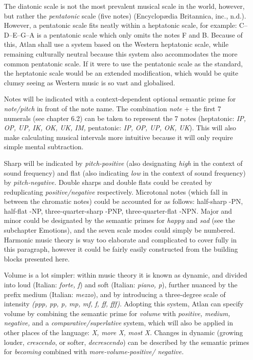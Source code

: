 The diatonic scale is not the most prevalent musical scale in the world, however, but rather the \textit{pentatonic} scale (five notes) (Encyclop\ae dia Britannica, inc., n.d.). However, a pentatonic scale fits neatly within a heptatonic scale, for example: C–D–E–G–A is a pentatonic scale which only omits the notes F and B. Because of this, Atlan shall use a system based on the Western heptatonic scale, while remaining culturally neutral because this system also accommodates the more common pentatonic scale. If it were to use the pentatonic scale as the standard, the heptatonic scale would be an extended modification, which would be quite clumsy seeing as Western music is so vast and globalised. 

Notes will be indicated with a context-dependent optional semantic prime for \textit{note/pitch} in front of the note name. The combination {\it note} + the first 7 numerals (see chapter 6.2) can be taken to represent the 7 notes (heptatonic: \textit{IP, OP, UP, IK, OK, UK, IM,} pentatonic: \textit{IP, OP, UP, OK, UK}). This will also make calculating musical intervals more intuitive because it will only require simple mental subtraction. 

Sharp will be indicated by \textit{pitch-positive} (also designating \textit{high} in the context of sound frequency) and flat (also indicating \textit{low} in the context of sound frequency) by \textit{pitch-negative.} Double sharps and double flats could be created by reduplicating \textit{positive/negative} respectively. Microtonal notes (which fall in between the chromatic notes) could be accounted for as follows: half-sharp -PN, half-flat -NP, three-quarter-sharp  -PNP, three-quarter-flat -NPN. Major and minor could be designated by the semantic primes for \textit{happy} and \textit{sad} (see the subchapter Emotions), and the seven scale modes could simply be numbered. Harmonic music theory is way too elaborate and complicated to cover fully in this paragraph, however it could be fairly easily constructed from the building blocks presented here. 

Volume is a lot simpler: within music theory it is known as dynamic, and divided into loud (Italian: \textit{forte, f}) and soft (Italian: \textit{piano, p}), further nuanced by the prefix medium (Italian: \textit{mezzo}), and by introducing a three-degree scale of intensity \textit{(ppp, pp, p, mp, mf, f, ff, fff)}. Adopting this system, Atlan can specify volume by combining the semantic prime for \textit{volume} with \textit{positive, medium, negative,} and a \textit{comparative/superlative} system, which will also be applied in other places of the language: \textit{X, more X, most X.} Changes in dynamic (growing louder, \textit{crescendo}, or softer, \textit{decrescendo}) can be described by the semantic primes for \textit{becoming} combined with \textit{more-volume-positive/ negative.} 

